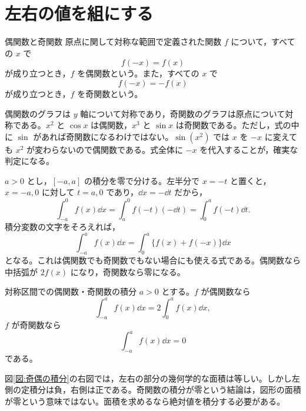 \section{左右の値を組にする}\label{節:奇偶の対称性}

\begin{definition}{偶関数と奇関数}
原点に関して対称な範囲で定義された関数 $f$ について，すべての $x$ で
\[
f(-x)=f(x)
\]
が成り立つとき，$f$ を偶関数という。また，すべての $x$ で
\[
f(-x)=-f(x)
\]
が成り立つとき，$f$ を奇関数という。
\end{definition}

偶関数のグラフは $y$ 軸について対称であり，奇関数のグラフは原点について対称である。$x^2$ と $\cos x$ は偶関数，$x^3$ と $\sin x$ は奇関数である。ただし，式の中に $\sin$ があれば奇関数になるわけではない。$\sin(x^2)$ では $x$ を $-x$ に変えても $x^2$ が変わらないので偶関数である。式全体に $-x$ を代入することが，確実な判定になる。

$a>0$ とし，$[-a,a]$ の積分を零で分ける。左半分で $x=-t$ と置くと，$x=-a,0$ に対して $t=a,0$ であり，$\dd x=-\dd t$ だから，
\[
\int_{-a}^{0}f(x)\dd x
 =\int_a^0 f(-t)(-\dd t)
 =\int_0^a f(-t)\dd t.
\]
積分変数の文字をそろえれば，
\begin{equation}\label{式:左右の積分}
\int_{-a}^a f(x)\dd x
 =\int_0^a\{f(x)+f(-x)\}\dd x
\end{equation}
となる。これは偶関数でも奇関数でもない場合にも使える式である。偶関数なら中括弧が $2f(x)$ になり，奇関数なら零になる。

\begin{theorem}{対称区間での偶関数・奇関数の積分}
$a>0$ とする。$f$ が偶関数なら
\[
\int_{-a}^a f(x)\dd x=2\int_0^a f(x)\dd x,
\]
$f$ が奇関数なら
\[
\int_{-a}^a f(x)\dd x=0
\]
である。
\end{theorem}

図\ref{図:奇偶の積分}の右図では，左右の部分の幾何学的な面積は等しい。しかし左側の定積分は負，右側は正である。奇関数の積分が零という結論は，図形の面積が零という意味ではない。面積を求めるなら絶対値を積分する必要がある。


